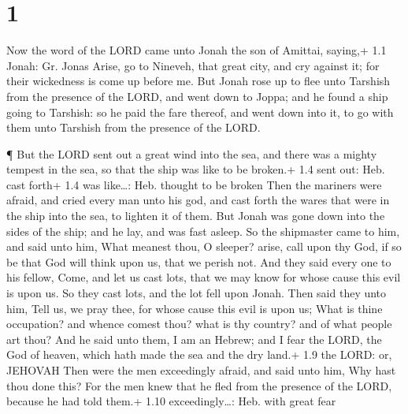 \hypertarget{section}{%
\section{1}\label{section}}

 Now the word of the LORD came unto Jonah the son of
Amittai, saying,+ 1.1 Jonah: Gr. Jonas  Arise, go to
Nineveh, that great city, and cry against it; for their wickedness is
come up before me.  But Jonah rose up to flee unto Tarshish
from the presence of the LORD, and went down to Joppa; and he found a
ship going to Tarshish: so he paid the fare thereof, and went down into
it, to go with them unto Tarshish from the presence of the LORD.

 ¶ But the LORD sent out a great wind into the sea, and
there was a mighty tempest in the sea, so that the ship was like to be
broken.+ 1.4 sent out: Heb. cast forth+ 1.4 was like\ldots: Heb. thought
to be broken  Then the mariners were afraid, and cried every
man unto his god, and cast forth the wares that were in the ship into
the sea, to lighten it of them. But Jonah was gone down into the sides
of the ship; and he lay, and was fast asleep.  So the
shipmaster came to him, and said unto him, What meanest thou, O sleeper?
arise, call upon thy God, if so be that God will think upon us, that we
perish not.  And they said every one to his fellow, Come,
and let us cast lots, that we may know for whose cause this evil is upon
us. So they cast lots, and the lot fell upon Jonah.  Then
said they unto him, Tell us, we pray thee, for whose cause this evil is
upon us; What is thine occupation? and whence comest thou? what is thy
country? and of what people art thou?  And he said unto
them, I am an Hebrew; and I fear the LORD, the God of heaven, which hath
made the sea and the dry land.+ 1.9 the LORD: or, JEHOVAH 
Then were the men exceedingly afraid, and said unto him, Why hast thou
done this? For the men knew that he fled from the presence of the LORD,
because he had told them.+ 1.10 exceedingly\ldots: Heb. with great fear

